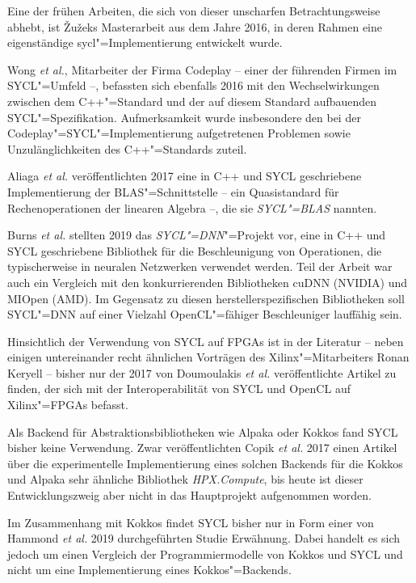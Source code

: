 Eine der frühen Arbeiten, die sich von dieser unscharfen Betrachtungsweise
abhebt, ist Žužeks Masterarbeit aus dem Jahre 2016, in deren Rahmen eine
eigenständige \gls{sycl}"=Implementierung entwickelt wurde.
\cite[vgl.][]{zuzek2016}

Wong \textit{et al.}, Mitarbeiter der Firma Codeplay -- einer der führenden
Firmen im SYCL"=Umfeld --, befassten sich ebenfalls 2016 mit den
Wechselwirkungen zwischen dem C++"=Standard und der auf diesem Standard
aufbauenden SYCL"=Spezifikation. Aufmerksamkeit wurde insbesondere den bei der
Codeplay"=SYCL"=Implementierung aufgetretenen Problemen sowie Unzulänglichkeiten
des C++"=Standards zuteil.
\cite[vgl.][]{wong2016}

Aliaga \textit{et al.} veröffentlichten 2017 eine in C++ und SYCL geschriebene
Implementierung der BLAS"=Schnittstelle -- ein Quasistandard für
Rechenoperationen der linearen Algebra --, die sie \textit{SYCL"=BLAS} nannten.
\cite[vgl.][]{aliaga2017}

Burns \textit{et al.} stellten 2019 das \textit{SYCL"=DNN}"=Projekt vor, eine in
C++ und SYCL geschriebene Bibliothek für die Beschleunigung von Operationen, die
typischerweise in neuralen Netzwerken verwendet werden. Teil der Arbeit war auch
ein Vergleich mit den konkurrierenden Bibliotheken cuDNN (NVIDIA) und
MIOpen (AMD). Im Gegensatz zu diesen herstellerspezifischen Bibliotheken soll
SYCL"=DNN auf einer Vielzahl OpenCL"=fähiger Beschleuniger lauffähig sein.
\cite[vgl.][]{burns2019}

Hinsichtlich der Verwendung von SYCL auf FPGAs ist in der Literatur -- neben
einigen untereinander recht ähnlichen Vorträgen des Xilinx"=Mitarbeiters Ronan
Keryell -- bisher nur der 2017 von Doumoulakis \textit{et al.} veröffentlichte
Artikel zu finden, der sich mit der Interoperabilität von SYCL und OpenCL auf
Xilinx"=FPGAs befasst.
\cite[vgl.][]{doumoulakis2017}

Als Backend für Abstraktionsbibliotheken wie Alpaka oder Kokkos fand SYCL bisher
keine Verwendung. Zwar veröffentlichten Copik \textit{et al.} 2017 einen Artikel
über die experimentelle Implementierung eines solchen Backends für die Kokkos
und Alpaka sehr ähnliche Bibliothek \textit{HPX.Compute}, bis heute ist dieser
Entwicklungszweig aber nicht in das Hauptprojekt aufgenommen worden.
\cite[vgl.][]{copik2017}

Im Zusammenhang mit Kokkos findet SYCL bisher nur in Form einer von Hammond
\textit{et al.} 2019 durchgeführten Studie Erwähnung. Dabei handelt es sich
jedoch um einen Vergleich der Programmiermodelle von Kokkos und SYCL und nicht
um eine Implementierung eines Kokkos"=Backends.
\cite[vgl.][]{hammond2019}

